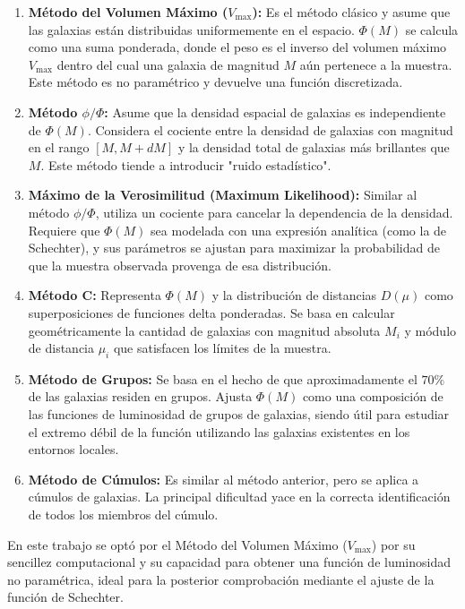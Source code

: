 \documentclass[twocolumn]{article}
\begin{document}
\begin{enumerate}
\item \textbf{Método del Volumen Máximo ($V_{\text{max}}$):} Es el método clásico y asume que las galaxias están distribuidas uniformemente en el espacio. $\Phi(M)$ se calcula como una suma ponderada, donde el peso es el inverso del volumen máximo $V_{\text{max}}$ dentro del cual una galaxia de magnitud $M$ aún pertenece a la muestra. Este método es no paramétrico y devuelve una función discretizada.

\item \textbf{Método $\phi/\Phi$:} Asume que la densidad espacial de galaxias es independiente de $\Phi(M)$. Considera el cociente entre la densidad de galaxias con magnitud en el rango $[M, M+dM]$ y la densidad total de galaxias más brillantes que $M$. Este método tiende a introducir "ruido estadístico".

\item \textbf{Máximo de la Verosimilitud (Maximum Likelihood):} Similar al método $\phi/\Phi$, utiliza un cociente para cancelar la dependencia de la densidad. Requiere que $\Phi(M)$ sea modelada con una expresión analítica (como la de Schechter), y sus parámetros se ajustan para maximizar la probabilidad de que la muestra observada provenga de esa distribución.

\item \textbf{Método C:} Representa $\Phi(M)$ y la distribución de distancias $D(\mu)$ como superposiciones de funciones delta ponderadas. Se basa en calcular geométricamente la cantidad de galaxias con magnitud absoluta $M_i$ y módulo de distancia $\mu_i$ que satisfacen los límites de la muestra.

\item \textbf{Método de Grupos:} Se basa en el hecho de que aproximadamente el $70\%$ de las galaxias residen en grupos. Ajusta $\Phi(M)$ como una composición de las funciones de luminosidad de grupos de galaxias, siendo útil para estudiar el extremo débil de la función utilizando las galaxias existentes en los entornos locales.

\item \textbf{Método de Cúmulos:} Es similar al método anterior, pero se aplica a cúmulos de galaxias. La principal dificultad yace en la correcta identificación de todos los miembros del cúmulo.
\end{enumerate}

En este trabajo se optó por el Método del Volumen Máximo ($V_{\text{max}}$) por su sencillez computacional y su capacidad para obtener una función de luminosidad no paramétrica, ideal para la posterior comprobación mediante el ajuste de la función de Schechter.
\end{document}
